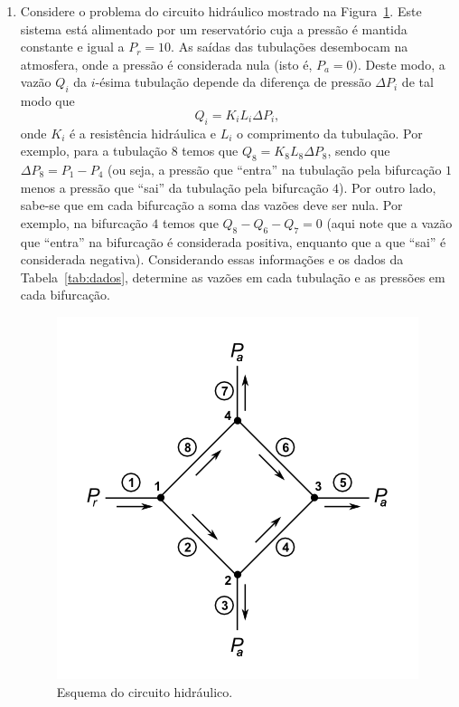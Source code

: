 \documentclass[12pt,a4paper]{article}
\begin{document}
\begin{enumerate}
 \item Considere o problema do circuito hidráulico mostrado na Figura~\ref{fig:tub}. Este sistema está alimentado por um reservatório 
cuja a pressão é mantida constante e igual a $P_r = 10$. As saídas das tubulações desembocam na atmosfera, onde a pressão é 
considerada nula (isto é, $P_a = 0$). Deste modo, a vazão $Q_i$ da $i$-ésima tubulação depende da diferença de pressão $\Delta P_i$ 
de tal modo que $$Q_i = K_iL_i\Delta P_i,$$ onde $K_i$ é a resistência hidráulica e $L_i$ o comprimento da tubulação. Por exemplo, para a 
tubulação $8$ temos que $Q_8 = K_8L_8\Delta P_8$, sendo que $\Delta P_8 = P_1 - P_4$ (ou seja, a pressão que ``entra'' na tubulação pela 
bifurcação $1$ menos a pressão que ``sai'' da tubulação pela bifurcação $4$). Por outro lado, sabe-se que em cada bifurcação a soma das vazões 
deve ser nula. Por exemplo, na bifurcação $4$ temos que $Q_8 - Q_6 - Q_7 = 0$ (aqui note que a vazão que ``entra'' na bifurcação é considerada positiva, 
enquanto que a que ``sai'' é considerada negativa). Considerando essas informações e os dados da Tabela~\ref{tab:dados}, determine as vazões em cada tubulação e as pressões 
em cada bifurcação.

\begin{figure}[!htb]
 \centering
 \includegraphics[scale=0.75]{imagem/Tubulacao.png}
 \caption{Esquema do circuito hidráulico.}
 \label{fig:tub}
\end{figure}


\end{enumerate}
\end{document}

